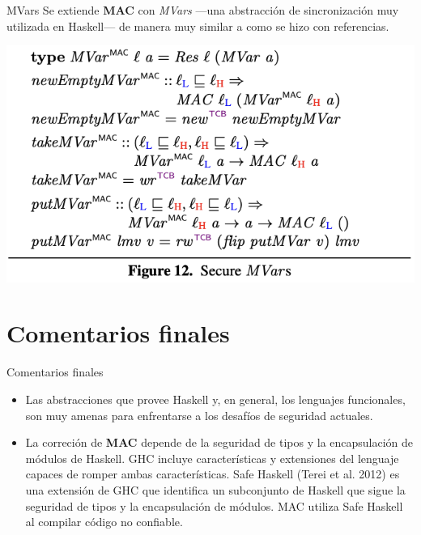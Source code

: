 \documentclass{beamer}
\begin{document}
\begin{frame}{MVars}
    Se extiende \textbf{MAC} con \textit{MVars} ---una abstracción de sincronización muy utilizada en Haskell--- de manera muy similar a como se hizo con referencias.
    
    \begin{center}
        \includegraphics[scale=0.8]{figure12.png}
    \end{center}
\end{frame}

\section{Comentarios finales}

\begin{frame}{Comentarios finales}
    \begin{itemize}
        \item<1-> Las abstracciones que provee Haskell y, en general, los lenguajes funcionales, son muy amenas para enfrentarse a los desafíos de seguridad actuales.

        \item<2-> La correción de \textbf{MAC} depende de la seguridad de tipos y la encapsulación de módulos de Haskell. GHC incluye características y extensiones del lenguaje capaces de romper ambas características. Safe Haskell (Terei et al. 2012) es una extensión de GHC que identifica un subconjunto de Haskell que sigue la seguridad de tipos y la encapsulación de módulos. MAC utiliza Safe Haskell al compilar código no confiable.
    \end{itemize}
\end{frame}

% 
% 
\end{document}
